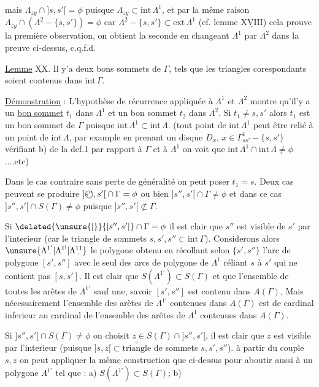 mais $\Lambda_{zy}\cap{]s,s'[}=\phi$ puisque $\Lambda_{zy}\subset\mathrm{int}\,\Lambda^1$, et par la même raison $\Lambda_{zy}\cap(\Lambda^2-\{s,s'\})=\phi$ car $\Lambda^2-\{s,s'\}\subset\mathrm{ext}\,\Lambda^1$ (cf. lemme $\overline{\underline{\mathrm{XVIII}}}$) cela prouve la première observation, on obtient la seconde en changeant $\Lambda^1$ par $\Lambda^2$ dans la preuve ci-dessus, c.q.f.d.

\uline{Lemme} $\overline{\underline{\mathrm{XX}}}$. Il y'a deux bons sommets de $\Gamma$,   tels que les  triangles corespondants soient contenus dans $\mathrm{int}\,\Gamma$.

\uline{Démonstration} : L'hypothèse de récurrence appliquée à $\Lambda^1$ et $\Lambda^2$ montre qu'il'y a un \uline{bon sommet} %
$t_1$ dans $\Lambda^1$ et un bon sommet $t_2$ dans $\Lambda^2$. Si $t_1\ne s,s'$ alors $t_1$ est un bon sommet de $\Gamma$ puisque $\mathrm{int}\,\Lambda^1\subset\mathrm{int}\,\Lambda$. (tout point de $\mathrm{int}\,\Lambda^1$ peut être relié à un point de $\mathrm{int}\,\Lambda$, par example en prenant un disque $D_x$, $x\in\Gamma^{1}_{ss'}-\{s,s'\}$ vérifiant b) de la def.1 par rapport à $\Gamma$ et à $\Lambda^1$ on voit que $\mathrm{int}\,\Lambda^1\cap\mathrm{int}\,\Lambda\ne\phi$....etc)

Dans le cas contraire sans perte de généralité on peut poser $t_1=s$. Deux cas peuvent se produire $ {]\text{\textcircled{\scriptsize \(s''\)}},s'[}\cap\Gamma=\phi$ ou bien $ {]s'',s'[}\cap\Gamma\ne\phi$ et dans ce cas $ {]s'',s'[}\cap S(\Gamma)\ne\phi$ puisque $ {]s'',s'[}\not\subset\Gamma$.

Si $\deleted{\unsure{[}}{]s'',s'[}\cap\Gamma=\phi$ il est clair que $s''$ est visible de $s'$ par l'interieur (car le triangle de sommets $s,s',s''\subset\mathrm{int}\,\Gamma$). Considerons alors $\unsure{\Lambda^{1'}_{\mkern5mu\cdot}|\Lambda^{1!}|\Lambda^{11}_{\mkern5mu\cdot}}$ le polygone \margin{!}obtenu en récollant selon  $\{s',s''\}$ l'arc de polygone $[s',s'']$ avec le seul des arcs de polygone de $\Lambda^1$ réliant $s$ à $s'$ qui ne contient pas $[s,s']$. Il est clair que $S(\Lambda^{1'})\subset S(\Gamma)$ et que l'ensemble de toutes les arêtes de $\Lambda^{1'}$ sauf une, savoir $[s',s'']$ est contenu dans $A(\Gamma)$, Mais nécessairement l'ensemble des arètes de $\Lambda^{1'}$ contenues dans $A(\Gamma)$ est de cardinal inferieur  %
au cardinal de l'ensemble des arêtes de $\Lambda^1$ contenues dans $A(\Gamma)$.

Si $ {]s'',s'[}\cap S(\Gamma)\ne\phi$ on choisit $z\in S(\Gamma)\cap{]s'',s'[}$, il est clair que $z$ est visible  par l'interieur (puisque $ {]s,z[}\subset\overset{\circ}{\text{triangle}}$ de sommets $s,s',s''$). à partir du couple $s,z$ on peut appliquer la même construction que ci-dessus pour aboutir aussi à un polygone $\Lambda^{1'}$ tel que : a) $S(\Lambda^{1'})\subset S(\Gamma)$; b)
